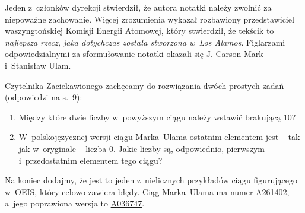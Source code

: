 Jeden z~członków dyrekcji stwierdził,
że autora notatki należy zwolnić za niepoważne zachowanie. Więcej zrozumienia
wykazał rozbawiony przedstawiciel waszyngtońskiej Komisji Energii Atomowej,
który stwierdził, że tekścik to {\it najlepsza rzecz, jaka dotychczas została
stworzona w~Los Alamos}.
Figlarzami odpowiedzialnymi za sformułowanie notatki okazali się J. Carson Mark i~Stanisław Ulam.
\vspace*{\parskip}
\begin{dwieszpalty}
Czytelnika Zaciekawionego zachęcamy do rozwiązania dwóch prostych zadań
(odpowiedzi na s.~\hypertarget{pytania}{}\hyperlink{odp}{9}):
\begin{enumerate}[label=(\alph*)]
\item Między które dwie liczby w~powyższym ciągu należy wstawić brakującą 10?
\item W~polskojęzycznej wersji ciągu Marka--Ulama ostatnim elementem jest -- tak
jak w~oryginale -- liczba 0. Jakie liczby są, odpowiednio, pierwszym i~przedostatnim elementem tego ciągu?	
\end{enumerate}

Na koniec dodajmy, że jest to jeden z~nielicznych przykładów ciągu figurującego w~OEIS, który celowo zawiera błędy. Ciąg Marka--Ulama ma numer \href{https://oeis.org/A261402}{A261402}, a~jego poprawiona wersja to \href{https://oeis.org/A036747}{A036747}.
\end{dwieszpalty}
\endinput	







